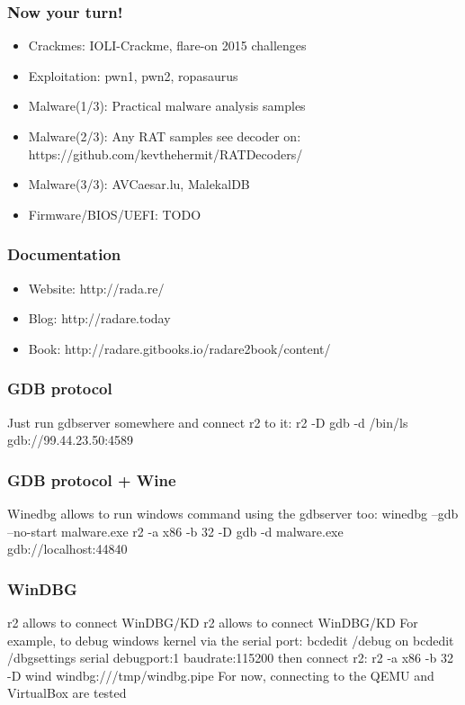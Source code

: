 \documentclass[10pt,pdf,utf8,english,compress,hyperref={unicode}]{beamer}
\begin{document}
\begin{frame}[fragile]
  \frametitle{Now your turn!}
    \begin{itemize}
    \item \alert{Crackmes:} IOLI-Crackme, flare-on 2015 challenges
    \item \alert{Exploitation:} pwn1, pwn2, ropasaurus
    \item \alert{Malware(1/3):} Practical malware analysis samples
    \item \alert{Malware(2/3):} Any RAT samples see decoder on: https://github.com/kevthehermit/RATDecoders/
    \item \alert{Malware(3/3):} AVCaesar.lu, MalekalDB
    \item \alert{Firmware/BIOS/UEFI:} TODO
    \end{itemize}
\end{frame}

\begin{frame}[fragile]
  \frametitle{Documentation}
    \begin{itemize}
    \item \alert{Website:} http://rada.re/
    \item \alert{Blog:} http://radare.today
    \item \alert{Book:} http://radare.gitbooks.io/radare2book/content/
    \end{itemize}
\end{frame}

\begin{frame}[fragile]
  \frametitle{GDB protocol}
  \center Just run gdbserver somewhere
  \center and connect r2 to it:
  \center r2 -D gdb -d /bin/ls gdb://99.44.23.50:4589
\end{frame}

\begin{frame}[fragile]
  \frametitle{GDB protocol + Wine}
  \center Winedbg allows to run windows command
  \center using the gdbserver too:
  \center winedbg --gdb --no-start malware.exe
  \center r2 -a x86 -b 32 -D gdb -d malware.exe gdb://localhost:44840
\end{frame}

\begin{frame}[fragile]
  \frametitle{WinDBG}
\ifxetex
  \center r2 allows to connect WinDBG/KD
\else
  \center r2 allows to connect WinDBG/KD 
\fi
  \center For example, to debug windows kernel via the serial port:
  \center bcdedit /debug on
  \center bcdedit /dbgsettings serial debugport:1 baudrate:115200
  \center then connect r2:
  \center r2 -a x86 -b 32 -D wind windbg:///tmp/windbg.pipe
  \center For now, connecting to the QEMU and VirtualBox are tested
\end{frame}
\end{document}
